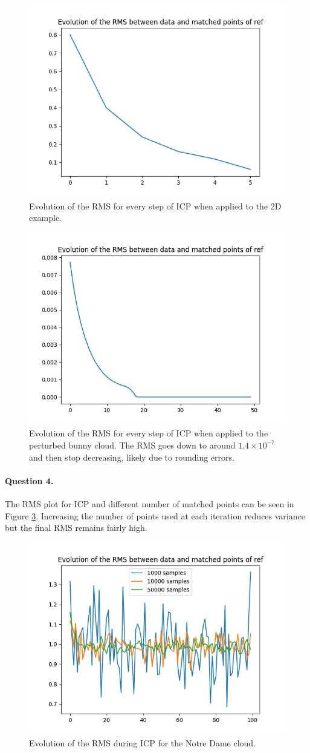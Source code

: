 \documentclass[french]{article}
\begin{document}
\begin{figure}[h]
	\centering
	\includegraphics[width=0.5\linewidth]{q3-2D.jpg}
	\caption{Evolution of the RMS for every step of ICP when applied to the 2D example.}
	\label{fig:q3-2d}
\end{figure}

\begin{figure}[h]
	\centering
	\includegraphics[width=0.5\linewidth]{q3-3D.jpg}
	\caption{Evolution of the RMS for every step of ICP when applied to the perturbed bunny cloud. The RMS goes down to around $1.4\times  10^{-7}$ and then stop decreasing, likely due to rounding errors.}
	\label{fig:q3-3d}
\end{figure}

\paragraph{Question 4.}
The RMS plot for ICP and different number of matched points can be seen in Figure \ref{fig:q4}. Increasing the number of points used at each iteration reduces variance but the final RMS remains fairly high.

\begin{figure}[h]
	\centering
	\includegraphics[width=0.6\linewidth]{q4.jpg}
	\caption{Evolution of the RMS during ICP for the Notre Dame cloud.}
	\label{fig:q4}
\end{figure}
\end{document}

